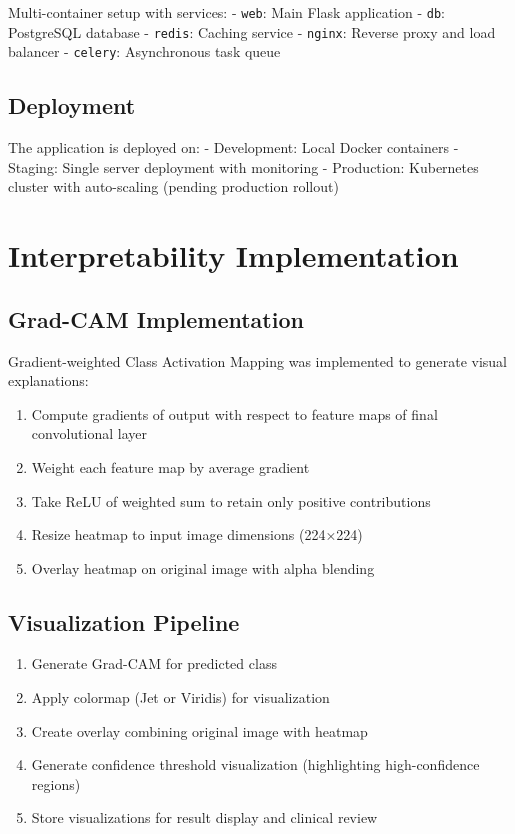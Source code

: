 {Multi-container setup with services:
- \texttt{web}: Main Flask application
- \texttt{db}: PostgreSQL database
- \texttt{redis}: Caching service
- \texttt{nginx}: Reverse proxy and load balancer
- \texttt{celery}: Asynchronous task queue

\subsection{Deployment}

The application is deployed on:
- Development: Local Docker containers
- Staging: Single server deployment with monitoring
- Production: Kubernetes cluster with auto-scaling (pending production rollout)

\section{Interpretability Implementation}

\subsection{Grad-CAM Implementation}

Gradient-weighted Class Activation Mapping was implemented to generate visual explanations:

\begin{enumerate}
    \item Compute gradients of output with respect to feature maps of final convolutional layer
    \item Weight each feature map by average gradient
    \item Take ReLU of weighted sum to retain only positive contributions
    \item Resize heatmap to input image dimensions (224×224)
    \item Overlay heatmap on original image with alpha blending
\end{enumerate}

\subsection{Visualization Pipeline}

\begin{enumerate}
    \item Generate Grad-CAM for predicted class
    \item Apply colormap (Jet or Viridis) for visualization
    \item Create overlay combining original image with heatmap
    \item Generate confidence threshold visualization (highlighting high-confidence regions)
    \item Store visualizations for result display and clinical review
\end{enumerate}

}
